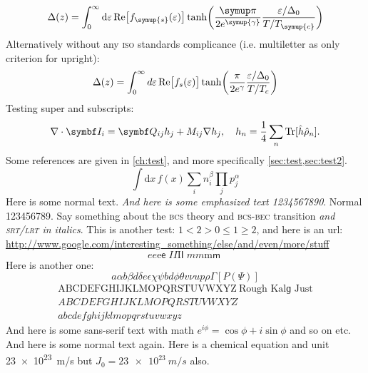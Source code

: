 \begin{equation}
  \Delta(z) = \int_0^{\infty} \mathrm{d}\epsilon\,\mathrm{Re}\big[f_{\symup{s}}(\epsilon)\big] \tanh\!\left(\frac{\symup\pi}{2e^{\symup{\gamma}}} \frac{\epsilon/\Delta_0}{T/T_{\symup{c}}}\right)
\end{equation}
Alternatively without any \textsc{iso} standards complicance (i.e. multiletter as only criterion for upright):
\begin{equation}
  \Delta(z) = \int_0^{\infty} \mathop{d\kern-0.02em\epsilon}\mathrm{Re}\big[f_s(\epsilon)\big] \tanh\!\left(\frac{\pi}{2e^{\gamma}} \frac{\epsilon/\Delta_0}{T/T_{c}}\right)
\end{equation}
Testing super and subscripts:
\begin{equation}
  \nabla \cdot \B{I}_{i} = \B{Q}_{ij} h_j + M_{ij} \nabla h_j, \quad 
  h_n = \frac{1}{4} \sum_n \mathrm{Tr}[\hat{h}\hat{\rho}_n].
\end{equation}
Some references are given in \cref{ch:test}, and more specifically \cref{sec:test,sec:test2}.
\begin{equation}
  \int \mathrm{d}x\, f(x) \sum_i n_i^\beta \prod_j p_j^\alpha
\end{equation}
Here is some normal text. \textit{And here is some emphasized text 1234567890}. Normal 123456789. 
Say something about the \textsc{bcs} theory and \textsc{bcs-bec} transition \emph{and \textsc{srt/lrt} in italics}.
This is another test: $1 < 2 > 0 \leq 1 \geq 2$, and here is an url: \url{http://www.google.com/interesting_something/else/and/even/more/stuff}
\begin{equation}
  \textit{e}e\mathrm{e}\textsf{e}\;%
  \textit{I}I\mathrm{I}\textsf{I}\;%
  \textit{m}m\mathrm{m}\textsf{m}\;%
\end{equation}
Here is another one:
\begin{equation}
  a\alpha b\beta d\delta e\epsilon \chi\psi bd \phi\theta v\nu u p\rho \Gamma[P(\Psi)]
\end{equation}
\begin{align}
  \text{ABCDEFGHIJKLMOPQRSTUVWXYZ}~\text{Rough Kalɡ Just}\\
  ABCDEFGHIJKLMOPQRSTUVWXYZ\\
  abcdefghijklmopqrstuvwxyz
\end{align}
\textsf{And here is some sans-serif text with math $e^{i\phi}=\cos\phi+i\sin\phi$ and so on etc.} And here is some normal text again.
Here is a chemical equation  and unit \SI{23e23}{m/s} but $J_0 = \SI{23e23}{m/s}$ also.

